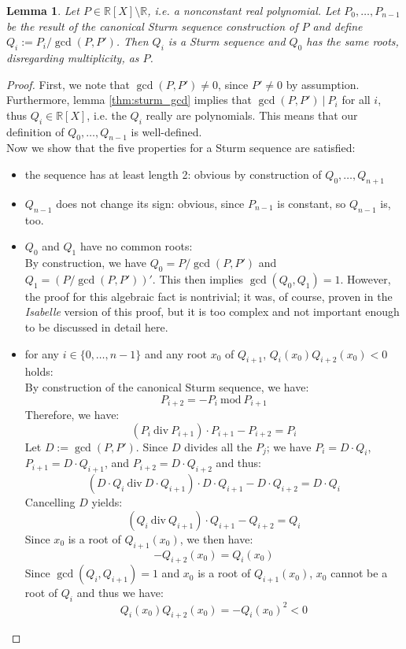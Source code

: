 \documentclass[11pt,a4paper,oneside]{article}
\newtheorem{lemma}[definition]{Lemma}
\newcommand{\RR}{\mathbb{R}}
\begin{document}
\begin{lemma}\label{thm:sturm_multiple_aux}
Let $P\in\RR[X]\setminus\RR$, i.e. a nonconstant real polynomial. Let $P_0,\ldots,P_{n-1}$ be the result of the canonical Sturm sequence construction of $P$ and define $Q_i := P_i / \gcd(P,P')$. Then $Q_i$ is a Sturm sequence and $Q_0$ has the same roots, disregarding multiplicity, as $P$.
\end{lemma}
\begin{proof}
First, we note that $\gcd(P,P')\neq 0$, since $P'\neq 0$ by assumption. Furthermore, lemma \ref{thm:sturm_gcd} implies that $\gcd(P,P')\ |\ P_i$ for all $i$, thus $Q_i\in\RR[X]$, i.e. the $Q_i$ really are polynomials. This means that our definition of $Q_0,\ldots,Q_{n-1}$ is well-defined.\\
Now we show that the five properties for a Sturm sequence are satisfied:
\begin{itemize}
\item the sequence has at least length 2: obvious by construction of $Q_0, \ldots, Q_{n+1}$
\item $Q_{n-1}$ does not change its sign: obvious, since $P_{n-1}$ is constant, so $Q_{n-1}$ is, too.
\item $Q_0$ and $Q_1$ have no common roots:\\
By construction, we have $Q_0 = P / \gcd(P,P')$ and $Q_1 = (P / \gcd(P, P'))'$. This then implies $\gcd(Q_0, Q_1) = 1$. However, the proof for this algebraic fact is nontrivial; it was, of course, proven in the \emph{Isabelle} version of this proof, but it is too complex and not important enough to be discussed in detail here.
\item for any $i\in\{0,\ldots,n-1\}$ and any root $x_0$ of $Q_{i+1}$, $Q_{i}(x_0)Q_{i+2}(x_0) < 0$ holds:\\
By construction of the canonical Sturm sequence, we have:
$$P_{i+2} = -P_{i}\ \mathrm{mod}\ P_{i+1}$$
Therefore, we have:
$$(P_{i}\ \mathrm{div}\ P_{i+1}) \cdot P_{i+1} - P_{i+2} = P_{i}$$
Let $D:=\gcd(P,P')$. Since $D$ divides all the $P_j$; we have $P_{i}=D\cdot Q_{i}$, $P_{i+1}=D\cdot Q_{i+1}$, and $P_{i+2}=D\cdot Q_{i+2}$ and thus:
$$(D\cdot Q_{i}\ \mathrm{div}\ D\cdot Q_{i+1}) \cdot D\cdot Q_{i+1} - D\cdot Q_{i+2} = D\cdot Q_{i}$$
Cancelling $D$ yields:
$$(Q_{i}\ \mathrm{div}\ Q_{i+1}) \cdot Q_{i+1} - Q_{i+2} = Q_{i}$$
Since $x_0$ is a root of $Q_{i+1}(x_0)$, we then have:
$$-Q_{i+2}(x_0) = Q_{i}(x_0)$$
Since $\gcd(Q_{i}, Q_{i+1}) = 1$ and $x_0$ is a root of $Q_{i+1}(x_0)$, $x_0$ cannot be a root of $Q_{i}$ and thus we have:
$$Q_{i}(x_0)Q_{i+2}(x_0) = -Q_{i}(x_0)^2 < 0$$


\end{itemize}
\end{proof}
\end{document}
